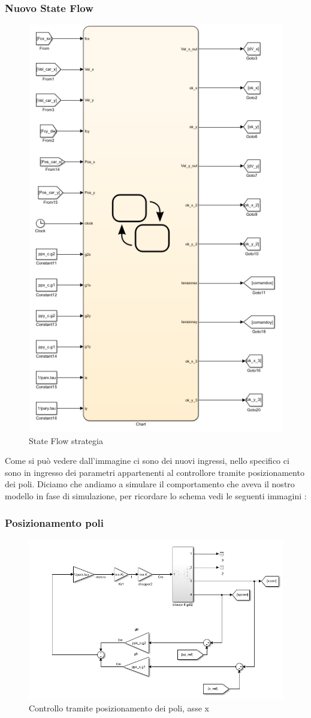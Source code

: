 \documentclass{article}
\begin{document}
\subsubsection{Nuovo State Flow}
\begin{figure}[H]
    \centering
    \includegraphics[width=.6\textwidth]{./stateflow/stateflowldm.png}
    \caption{State Flow strategia}
\end{figure}
Come si può vedere dall'immagine ci sono dei nuovi ingressi, nello specifico ci sono in ingresso dei parametri appartenenti al controllore tramite posizionamento dei poli.
Diciamo che andiamo a simulare il comportamento che aveva il nostro modello in fase di simulazione, per ricordare lo schema vedi le seguenti immagini :

\subsubsection{Posizionamento poli
}
\begin{figure}[H]
    \centering
    \includegraphics[width=.6\textwidth]{./simulink/pospoli/x/Cpospoli.png}
    \caption{Controllo tramite posizionamento dei poli, asse x}
\end{figure}
\end{document}
